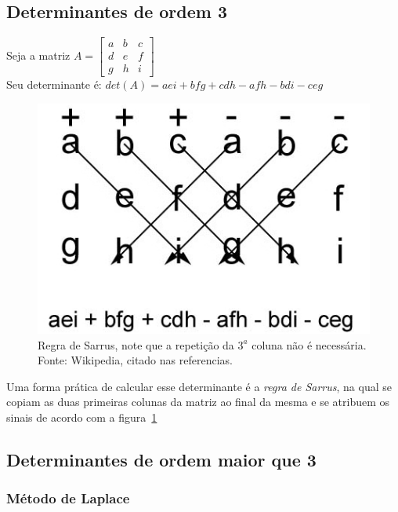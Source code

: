    \subsection{Determinantes de ordem 3}
  
Seja a matriz $A=\begin{bmatrix}
     a & b & c\\d & e & f\\g & h & i
   \end{bmatrix}$\\
   Seu determinante é: $det(A)=aei+bfg+cdh-afh-bdi-ceg$\\
   \begin{figure}[t]
   \centering
     \includegraphics[scale=0.3]{Determinant_3x3-wikipedia.jpg}
     \caption{Regra de Sarrus, note que a repetição da $3^a$ coluna não é necessária. Fonte: Wikipedia, citado nas referencias.}
     \label{fig1}
   \end{figure}
Uma forma prática de calcular esse determinante é a \textit{regra de Sarrus}, na qual se copiam as duas primeiras 
colunas da matriz ao final da mesma e se atribuem os sinais de acordo com a figura~\ref{fig1}
   
   \subsection{Determinantes de ordem maior que 3}
   \subsubsection*{Método de Laplace}

